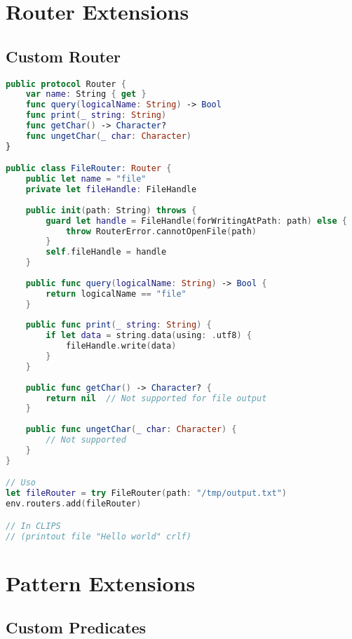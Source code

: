 \section{Router Extensions}

\subsection{Custom Router}

\begin{lstlisting}[language=Swift]
public protocol Router {
    var name: String { get }
    func query(logicalName: String) -> Bool
    func print(_ string: String)
    func getChar() -> Character?
    func ungetChar(_ char: Character)
}

public class FileRouter: Router {
    public let name = "file"
    private let fileHandle: FileHandle
    
    public init(path: String) throws {
        guard let handle = FileHandle(forWritingAtPath: path) else {
            throw RouterError.cannotOpenFile(path)
        }
        self.fileHandle = handle
    }
    
    public func query(logicalName: String) -> Bool {
        return logicalName == "file"
    }
    
    public func print(_ string: String) {
        if let data = string.data(using: .utf8) {
            fileHandle.write(data)
        }
    }
    
    public func getChar() -> Character? {
        return nil  // Not supported for file output
    }
    
    public func ungetChar(_ char: Character) {
        // Not supported
    }
}

// Uso
let fileRouter = try FileRouter(path: "/tmp/output.txt")
env.routers.add(fileRouter)

// In CLIPS
// (printout file "Hello world" crlf)
\end{lstlisting}

\section{Pattern Extensions}

\subsection{Custom Predicates}

